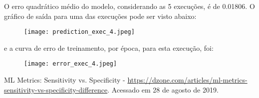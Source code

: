 \documentclass{article}
\begin{document}
O erro quadrático médio do modelo, considerando as 5 execuções, é de 0.01806. O gráfico de saída para uma das execuções pode ser visto abaixo:

\begin{figure}[H]
\centering
\texttt{[image: prediction\_exec\_4.jpeg]}
\end{figure}

\noindent
e a curva de erro de treinamento, por época, para esta execução, foi:

\begin{figure}[H]
\centering
\texttt{[image: error\_exec\_4.jpeg]}
\end{figure}

\begin{thebibliography}{1}

	ML Metrics: Sensitivity vs. Specificity -
	\url{https://dzone.com/articles/ml-metrics-sensitivity-vs-specificity-difference}.
	Acessado em 28 de agosto de 2019.


\end{thebibliography}
\end{document}
